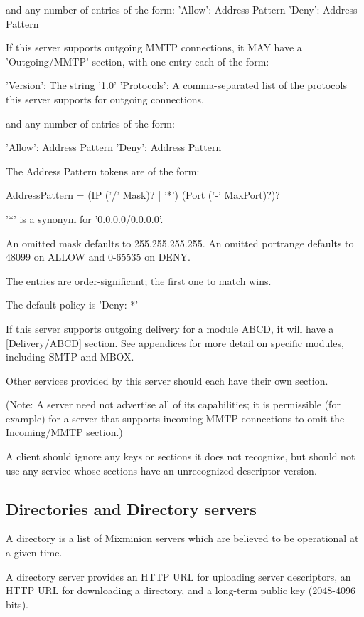and any number of entries of the form:
     'Allow': Address Pattern
     'Deny': Address Pattern

If this server supports outgoing MMTP connections, it MAY have a
'Outgoing/MMTP' section, with one entry each of the form:

      'Version': The string '1.0'
      'Protocols': A comma-separated list of the protocols this server
           supports for outgoing connections.

and any number of entries of the form:

      'Allow': Address Pattern
      'Deny': Address Pattern

The Address Pattern tokens are of the form:

   AddressPattern = (IP ('/' Mask)? | '*') (Port ('-' MaxPort)?)?

'*' is a synonym for '0.0.0.0/0.0.0.0'.

An omitted mask defaults to 255.255.255.255.  An omitted portrange
defaults to 48099 on ALLOW and 0-65535 on DENY.

The entries are order-significant; the first one to match wins.

The default policy is 'Deny: *'

If this server supports outgoing delivery for a module ABCD, it will
have a [Delivery/ABCD] section.  See appendices for more detail on
specific modules, including SMTP and MBOX.

Other services provided by this server should each have their own section.

(Note: A server need not advertise all of its capabilities; it is
permissible (for example) for a server that supports incoming MMTP
connections to omit the Incoming/MMTP section.)

A client should ignore any keys or sections it does not recognize, but
should not use any service whose sections have an unrecognized
descriptor version.

\subsection{Directories and Directory servers}

A directory is a list of Mixminion servers which are believed to
be operational at a given time.

A directory server provides an HTTP URL for uploading server
descriptors, an HTTP URL for downloading a directory, and a long-term
public key (2048-4096 bits).

